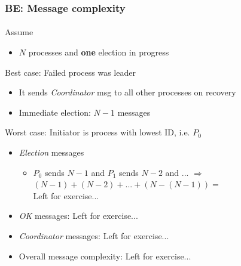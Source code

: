 \begin{frame}
\frametitle{BE: Message complexity}
\framesubtitle{}
Assume
\begin{itemize}
\item $N$ processes and \textbf{one} election in progress
\end{itemize}

Best case: Failed process was leader
\begin{itemize}
  \item It sends \textit{Coordinator} msg to all other processes on recovery
  \item Immediate election: $N-1$ messages
\end{itemize}


Worst case: Initiator is process with lowest ID, i.e. $P_0$
\begin{itemize}
\item \textit{Election} messages
  \begin{itemize}
  \item $P_0$ sends $N-1$ and $P_1$ sends $N-2$ and ... $\Rightarrow$\\
    $(N-1) + (N-2) + ... + (N - (N-1)) = $\\
    Left for exercise...
  \end{itemize}
\item \textit{OK} messages: Left for exercise...%
\item \textit{Coordinator} messages: Left for exercise...%
\item Overall message complexity: Left for exercise...%
  \end{itemize}
\end{frame}



